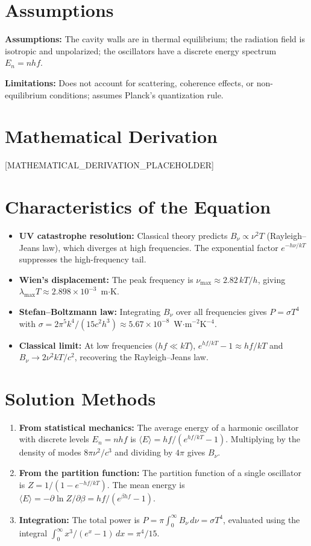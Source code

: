 \documentclass[11pt,openright]{book}
\begin{document}
\section*{Assumptions}

\textbf{Assumptions:} The cavity walls are in thermal equilibrium; the radiation field is isotropic and unpolarized; the oscillators have a discrete energy spectrum $E_{n} = nhf$.


\textbf{Limitations:} Does not account for scattering, coherence effects, or non-equilibrium conditions; assumes Planck's quantization rule.


\section*{Mathematical Derivation}

[MATHEMATICAL_DERIVATION_PLACEHOLDER]

\section*{Characteristics of the Equation}

\begin{itemize}
  \item \textbf{UV catastrophe resolution:} Classical theory predicts $B_{\nu} \propto \nu^{2}T$ (Rayleigh--Jeans law), which diverges at high frequencies. The exponential factor $e^{-h\nu/kT}$ suppresses the high-frequency tail.
  \item \textbf{Wien's displacement:} The peak frequency is $\nu_{\text{max}} \approx 2.82\,kT/h$, giving $\lambda_{\text{max}} T \approx 2.898 \times 10^{-3}$~m$\cdot$K.
  \item \textbf{Stefan--Boltzmann law:} Integrating $B_{\nu}$ over all frequencies gives $P = \sigma T^{4}$ with $\sigma = 2\pi^{5}k^{4}/(15c^{2}h^{3}) \approx 5.67 \times 10^{-8}$~W$\cdot$m$^{-2}$K$^{-4}$.
  \item \textbf{Classical limit:} At low frequencies ($hf \ll kT$), $e^{hf/kT} - 1 \approx hf/kT$ and $B_{\nu} \to 2\nu^{2}kT/c^{2}$, recovering the Rayleigh--Jeans law.
\end{itemize}
\section*{Solution Methods}

\begin{enumerate}
  \item \textbf{From statistical mechanics:} The average energy of a harmonic oscillator with discrete levels $E_{n} = nhf$ is $\langle E\rangle = hf/(e^{hf/kT} - 1)$. Multiplying by the density of modes $8\pi\nu^{2}/c^{3}$ and dividing by $4\pi$ gives $B_{\nu}$.
  \item \textbf{From the partition function:} The partition function of a single oscillator is $Z = 1/(1 - e^{-hf/kT})$. The mean energy is $\langle E\rangle = -\partial\ln Z/\partial\beta = hf/(e^{\beta hf} - 1)$.
  \item \textbf{Integration:} The total power is $P = \pi\int_{0}^{\infty} B_{\nu}\,d\nu = \sigma T^{4}$, evaluated using the integral $\int_{0}^{\infty} x^{3}/(e^{x}-1)\,dx = \pi^{4}/15$.
\end{enumerate}
\end{document}
